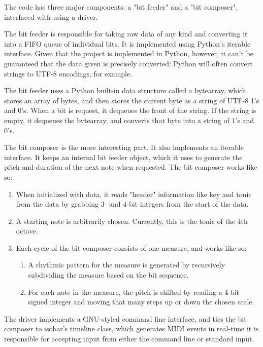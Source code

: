 \documentclass[runningheads,a4paper]{llncs}
\begin{document}

The code has three major components: a "bit feeder" and a "bit composer",
interfaced with using a driver.

The bit feeder is responsible for taking raw data of any kind and converting it
into a FIFO queue of individual bits. It is implemented using Python's iterable
interface. Given that the project is implemented in Python, however, it can't be
guaranteed that the data given is precisely converted: Python will often convert
strings to UTF-8 encodings, for example.

The bit feeder uses a Python built-in data structure called a bytearray, which
stores an array of bytes, and then stores the current byte as a string of UTF-8
1's and 0's. When a bit is request, it dequeues the front of the string. If the
string is empty, it dequeues the bytearray, and converts that byte into a string
of 1's and 0's.

The bit composer is the more interesting part. It also implements an iterable
interface. It keeps an internal bit feeder object, which it uses to generate the
pitch and duration of the next note when requested. The bit composer works like
so:

\begin{enumerate}
\item When initialized with data, it reads "header" information like key and
tonic from the data by grabbing 3- and 4-bit integers from the start of the
data.

\item A starting note is arbitrarily chosen. Currently, this is the tonic of the
4th octave.

\item Each cycle of the bit composer consists of one measure, and works like so:
    \begin{enumerate}
    \item A rhythmic pattern for the measure is generated by recursively
    subdividing the measure based on the bit sequence.

    \item For each note in the measure, the pitch is shifted by reading a 4-bit
    signed integer and moving that many steps up or down the chosen scale.
    \end{enumerate}
\end{enumerate}

The driver implements a GNU-styled command line interface, and ties the bit
composer to isobar's timeline class, which generates MIDI events in real-time it
is responsible for accepting input from either the command line or standard
input.
\end{document}
